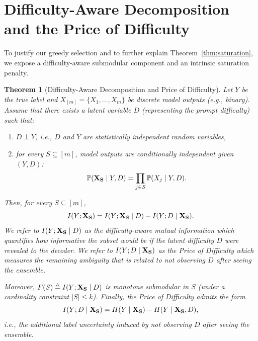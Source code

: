 \documentclass{article}
\theoremstyle{plain}
\newtheorem{theorem}{Theorem}[section]
\theoremstyle{definition}
\theoremstyle{remark}
\begin{document}
\section{Difficulty-Aware Decomposition and the Price of Difficulty}
\label{subsec:difficulty-aware}
To justify our greedy selection and to further explain Theorem~\ref{thm:saturation}, we expose a difficulty-aware submodular component and an intrinsic saturation penalty.
\begin{theorem}[Difficulty-Aware Decomposition and Price of Difficulty]\label{thm:oracle_price}
Let $Y$ be the true label and $X_{[m]}=\{X_1,\dots,X_m\}$ be discrete model outputs (e.g., binary).
Assume that there exists a latent variable $D$ (representing the prompt difficulty) such that:
\begin{enumerate}
    \item $D \perp Y$, i.e., $D$ and $Y$ are statistically independent random variables,
    \item for every $S\subseteq[m]$, model outputs are conditionally independent given $(Y,D)$:
    \begin{equation}\label{eq:cond_indep}
        \mathbb{P}({\bf X_S}\mid Y,D)=\prod_{j\in S} \mathbb{P}(X_j\mid Y,D).
    \end{equation}
\end{enumerate}
Then, for every $S\subseteq[m]$,
\begin{equation}\label{eq:oracle_decomp_main}
    I(Y;{\bf X_S})= I(Y;{\bf X_S} \mid D) - I(Y;D\mid {\bf X_S}).
\end{equation}
We refer to $I(Y;{\bf X_S}\mid D)$ as the difficulty-aware mutual information which quantifies how informative the subset would be if the latent difficulty $D$ were revealed to the decoder. We refer to $I(Y;D\mid {\bf X_S})$ as the Price of Difficulty which measures the remaining ambiguity that is related to not observing $D$ after seeing the ensemble.

Moreover, $F(S)\triangleq I(Y;{\bf X_S} \mid D)$ is monotone submodular in $S$ (under a cardinality constraint $|S|\le k$).
Finally, the Price of Difficulty admits the form
\begin{equation}\label{eq:price_operational}
    I(Y;D\mid {\bf X_S})=H(Y\mid {\bf X_S})-H(Y\mid {\bf X_S},D),
\end{equation}
i.e., the additional label uncertainty induced by not observing $D$ after seeing the ensemble.
\end{theorem}
\end{document}
